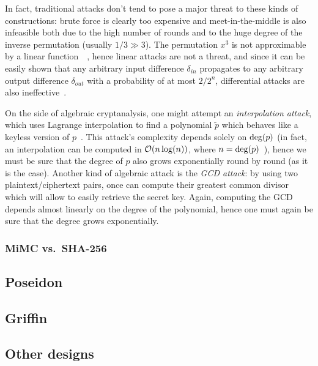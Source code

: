 In fact, traditional attacks don't tend to pose a major threat to these kinds of constructions:
brute force is clearly too expensive and meet-in-the-middle is also infeasible both due to the high 
number of rounds and to the huge degree of the inverse permutation (usually \(1/3 \gg 3\)).
The permutation \(x^3\) is not approximable by a linear function~~\cite{AbdelraheemABL2012}, 
hence linear attacks are not a threat, and since it can be easily shown that any arbitrary input 
difference \(\delta_{in} \) propagates to any arbitrary output difference \(\delta_{out} \) with a 
probability of at most \({2}/{2^n}\), differential attacks are also ineffective~\cite{Nyberg1994}.

On the side of algebraic cryptanalysis, one might attempt an \emph{interpolation attack}, which 
uses Lagrange interpolation to find a polynomial \(\tilde{p}\) which behaves like a keyless version 
of \(p\)~\cite{JakobsenK1997}.
This attack's complexity depends solely on \(\call{\deg}{p}\) (in fact, an interpolation can be 
computed in \(\BigO{n\call{\log}{n}}\), where \(n = \call{\deg}{p}\)~\cite{Stoss1985}), hence we 
must be sure that the degree of \(p\) also grows exponentially round by round (as it is the case).
Another kind of algebraic attack is the \emph{GCD attack}: by using two plaintext/ciphertext pairs,
once can compute their greatest common divisor which will allow to easily retrieve the secret key.
Again, computing the GCD depends almost linearly on the degree of the polynomial, hence one must 
again be sure that the degree grows exponentially.

\subsubsection*{MiMC vs.\ SHA-256}

\subsection{Poseidon}
\subsection{Griffin}
\subsection{Other designs}
